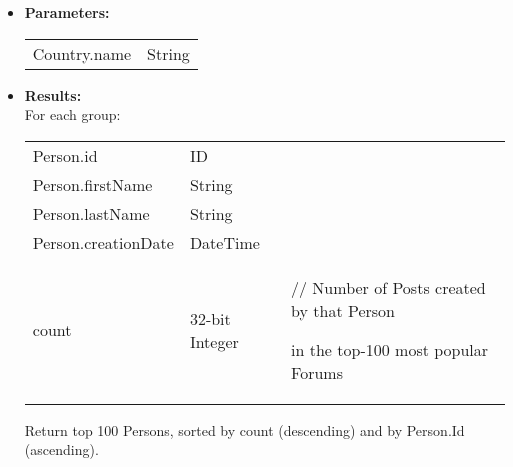 {\begin{enumerate}
\begin{itemize}
                  Group persons by:
                  \begin{itemize}
                      \item First, id
                      \item Second, first name
                      \item Third, last name
                      \item Fourth, creation date
                  \end{itemize}
                \item \textbf{Parameters:} \\
                    \begin{tabular}{ll}
                      Country.name & String \\ 
                    \end{tabular}
                \item \textbf{Results:} \\
                   For each group:
                    \begin{tabular}{lll}
                      Person.id & ID & \\
                      Person.firstName & String & \\
                      Person.lastName & String & \\
                      Person.creationDate & DateTime & \\
                      count & 32-bit Integer & \parbox[t]{20cm}{ // Number of Posts created by that Person \par in the top-100
                        most popular Forums\strut}  \\
                    \end{tabular}
                    Return top 100 Persons, sorted by count (descending) and by Person.Id (ascending).
                    \end{itemize}


\end{enumerate}}
